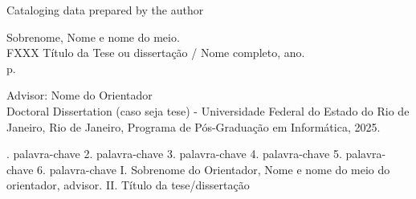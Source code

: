 
\vspace*{14.0cm}
\begin{center}
    Cataloging data prepared by the author
\end{center}
\begin{framed}
    \fontsize{10pt}{10pt}\selectfont \hspace*{0.5cm} Sobrenome, Nome e nome do meio. \\ FXXX \hspace{0.8cm} Título da Tese ou dissertação / Nome completo, ano. \\ \hspace*{1.2cm} \pageref{LastPage}p.
    \vspace{0.3cm}

    \noindent \hspace*{1.5cm} \fontsize{10pt}{10pt}\selectfont Advisor: Nome do Orientador \\ \hspace*{1.6cm}Doctoral Dissertation (caso seja tese) - Universidade Federal do Estado do Rio de Janeiro, Rio de Janeiro, Programa de Pós-Graduação em Informática, 2025.
    \vspace{0.3cm}

    \noindent \hspace*{1.7cm} \fontsize{10pt}{10pt}. palavra-chave 2. palavra-chave 3. palavra-chave 4. palavra-chave 5. palavra-chave 6. palavra-chave  I. Sobrenome do Orientador, Nome e nome do meio do orientador, advisor. II. Título da tese/dissertação
    \vspace{0.3cm}
\end{framed}
\thispagestyle{empty}
\newpage


